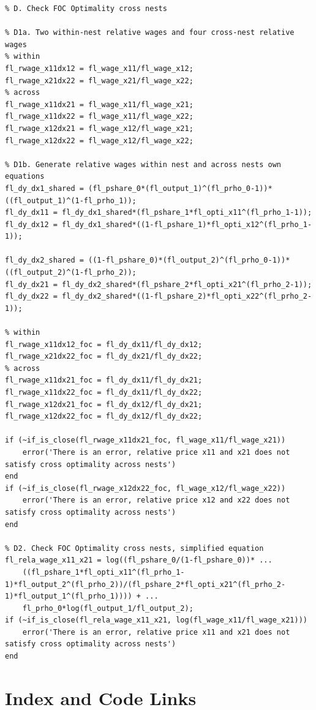 \documentclass[
]{book}
\begin{document}
\begin{verbatim}
% D. Check FOC Optimality cross nests

% D1a. Two within-nest relative wages and four cross-nest relative wages
% within
fl_rwage_x11dx12 = fl_wage_x11/fl_wage_x12;
fl_rwage_x21dx22 = fl_wage_x21/fl_wage_x22;
% across
fl_rwage_x11dx21 = fl_wage_x11/fl_wage_x21;
fl_rwage_x11dx22 = fl_wage_x11/fl_wage_x22;
fl_rwage_x12dx21 = fl_wage_x12/fl_wage_x21;
fl_rwage_x12dx22 = fl_wage_x12/fl_wage_x22;

% D1b. Generate relative wages within nest and across nests own equations
fl_dy_dx1_shared = (fl_pshare_0*(fl_output_1)^(fl_prho_0-1))*((fl_output_1)^(1-fl_prho_1));
fl_dy_dx11 = fl_dy_dx1_shared*(fl_pshare_1*fl_opti_x11^(fl_prho_1-1));
fl_dy_dx12 = fl_dy_dx1_shared*((1-fl_pshare_1)*fl_opti_x12^(fl_prho_1-1));

fl_dy_dx2_shared = ((1-fl_pshare_0)*(fl_output_2)^(fl_prho_0-1))*((fl_output_2)^(1-fl_prho_2));
fl_dy_dx21 = fl_dy_dx2_shared*(fl_pshare_2*fl_opti_x21^(fl_prho_2-1));
fl_dy_dx22 = fl_dy_dx2_shared*((1-fl_pshare_2)*fl_opti_x22^(fl_prho_2-1));

% within
fl_rwage_x11dx12_foc = fl_dy_dx11/fl_dy_dx12;
fl_rwage_x21dx22_foc = fl_dy_dx21/fl_dy_dx22;
% across
fl_rwage_x11dx21_foc = fl_dy_dx11/fl_dy_dx21;
fl_rwage_x11dx22_foc = fl_dy_dx11/fl_dy_dx22;
fl_rwage_x12dx21_foc = fl_dy_dx12/fl_dy_dx21;
fl_rwage_x12dx22_foc = fl_dy_dx12/fl_dy_dx22;

if (~if_is_close(fl_rwage_x11dx21_foc, fl_wage_x11/fl_wage_x21))
    error('There is an error, relative price x11 and x21 does not satisfy cross optimality across nests')
end
if (~if_is_close(fl_rwage_x12dx22_foc, fl_wage_x12/fl_wage_x22))
    error('There is an error, relative price x12 and x22 does not satisfy cross optimality across nests')
end

% D2. Check FOC Optimality cross nests, simplified equation
fl_rela_wage_x11_x21 = log((fl_pshare_0/(1-fl_pshare_0))* ...
    ((fl_pshare_1*fl_opti_x11^(fl_prho_1-1)*fl_output_2^(fl_prho_2))/(fl_pshare_2*fl_opti_x21^(fl_prho_2-1)*fl_output_1^(fl_prho_1)))) + ...
    fl_prho_0*log(fl_output_1/fl_output_2);
if (~if_is_close(fl_rela_wage_x11_x21, log(fl_wage_x11/fl_wage_x21)))
    error('There is an error, relative price x11 and x21 does not satisfy cross optimality across nests')
end
\end{verbatim}

\hypertarget{appendix-appendix}{%
\appendix}


\hypertarget{index-and-code-links}{%
\chapter{Index and Code Links}\label{index-and-code-links}}
\end{document}
